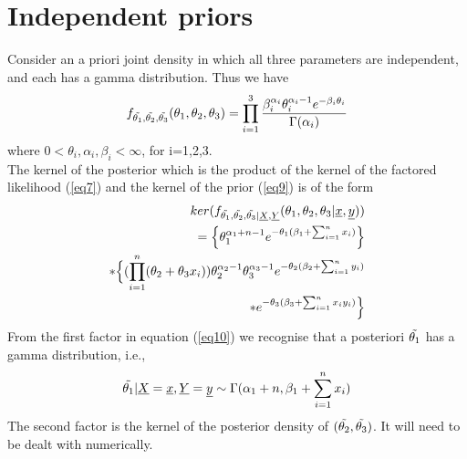 \documentclass[12pt]{article}    %
\numberwithin{equation}{section}
\begin{document}
\section{Independent priors} \label{sec:Independents}
Consider an a priori joint density in which all three parameters are independent, and each has a gamma distribution. Thus we have
\begin{equation}\label{eq9}
f_{\Tilde{\theta_1},\Tilde{\theta_2},\Tilde{\theta_3}}(\theta_1,\theta_2,\theta_3) = \prod^3_{i=1}\frac{\beta_i^{\alpha_i}\theta_i^{\alpha_i-1}e^{-\beta_i\theta_i}}{\Gamma(\alpha_i)}
\end{equation}
where $0 < \theta_i, \alpha_i, \beta_i <\infty$, for i=1,2,3.\\
The kernel of the posterior which is the product of the kernel of the factored likelihood (\ref{eq7}) and the kernel of the prior (\ref{eq9}) is of the form 
\begin{equation}\label{eq10}
\begin{split}
ker(f_{\Tilde{\theta_1},\Tilde{\theta_2},\Tilde{\theta_3}|\underline{X},\underline{Y}}(\theta_1,\theta_2,\theta_3|\underline{x},\underline{y})) \\
= \Big \{\theta_1^{\alpha_1+n-1}e^{-\theta_1(\beta_1+\sum^n_{i=1}x_i)} \Big \}\\
* \Big \{(\prod^n_{i=1}(\theta_2+\theta_3{x_i}))\theta_2^{\alpha_2-1}\theta_3^{\alpha_3-1}e^{-\theta_2(\beta_2+\sum^n_{i=1}{y_i})} \\
* e^{-\theta_3(\beta_3+\sum^n_{i=1}{x_iy_i})}\Big \}
\end{split}
\end{equation}
From the first factor in equation (\ref{eq10}) we recognise that a posteriori $\Tilde{\theta_1}$ has a gamma distribution, i.e.,
\begin{equation}\label{eq11}
\Tilde{\theta_1}|\underline{X}=\underline{x},\underline{Y}=\underline{y} \sim \Gamma(\alpha_1+n, \beta_1+\sum^n_{i=1}{x_i})
\end{equation}
The second factor is the kernel of the posterior density of $(\Tilde{\theta_2}, \Tilde{\theta_3})$. It will need to be dealt with numerically.
\end{document}
